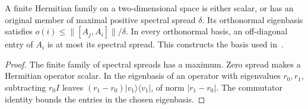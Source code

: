 \begin{lemma}
    \label{thm:hastings05_two_dim_basis_construction}
    \leanok
    A finite Hermitian family on a two-dimensional space is either scalar, or
    has an original member of maximal positive spectral spread $\delta$.
    Its orthonormal eigenbasis satisfies $o(i)\le\|[A_j,A_i]\|/\delta$.
    In every orthonormal basis, an off-diagonal entry of $A_i$ is at most its
    spectral spread. This constructs the basis used
    in~\cite[lines 1678--1694]{Hastings2006Solving}.
\end{lemma}
\begin{proof}\leanok
    The finite family of spectral spreads has a maximum. Zero spread makes a
    Hermitian operator scalar. In the eigenbasis of an operator with eigenvalues
    $r_0,r_1$, subtracting $r_0I$ leaves
    $(r_1-r_0)|v_1\rangle\langle v_1|$, of norm $|r_1-r_0|$.
    The commutator identity bounds the entries in the chosen eigenbasis.
\end{proof}

